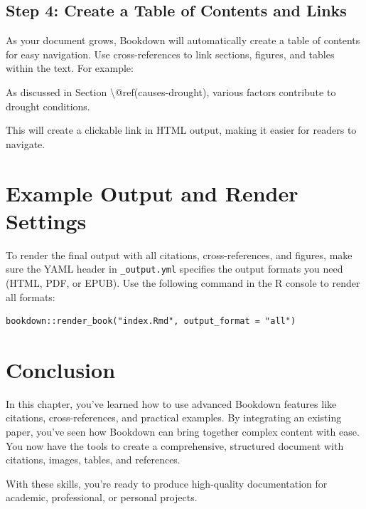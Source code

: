 \documentclass[
]{book}
\newenvironment{Shaded}{\begin{snugshade}}{\end{snugshade}}
\newcommand{\NormalTok}[1]{#1}
\theoremstyle{definition}
\theoremstyle{definition}
\theoremstyle{definition}
\theoremstyle{definition}
\theoremstyle{remark}
\begin{document}
\subsection{Step 4: Create a Table of Contents and Links}\label{step-4-create-a-table-of-contents-and-links}

As your document grows, Bookdown will automatically create a table of contents for easy navigation. Use cross-references to link sections, figures, and tables within the text. For example:

\begin{Shaded}
\begin{Highlighting}[]
\NormalTok{As discussed in Section \textbackslash{}@ref(causes{-}drought), various factors contribute to drought conditions.}
\end{Highlighting}
\end{Shaded}

This will create a clickable link in HTML output, making it easier for readers to navigate.

\section{Example Output and Render Settings}\label{example-output-and-render-settings}

To render the final output with all citations, cross-references, and figures, make sure the YAML header in \texttt{\_output.yml} specifies the output formats you need (HTML, PDF, or EPUB). Use the following command in the R console to render all formats:

\begin{verbatim}
bookdown::render_book("index.Rmd", output_format = "all")
\end{verbatim}

\section{Conclusion}\label{conclusion}

In this chapter, you've learned how to use advanced Bookdown features like citations, cross-references, and practical examples. By integrating an existing paper, you've seen how Bookdown can bring together complex content with ease. You now have the tools to create a comprehensive, structured document with citations, images, tables, and references.

With these skills, you're ready to produce high-quality documentation for academic, professional, or personal projects.
\end{document}
